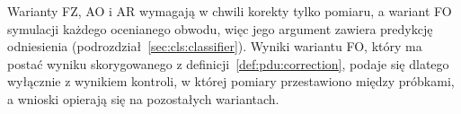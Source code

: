 
Warianty FZ, AO i AR wymagają w chwili korekty tylko pomiaru, a wariant FO symulacji każdego ocenianego obwodu, więc jego argument zawiera predykcję odniesienia (podrozdział~\ref{sec:cls:classifier}).
Wyniki wariantu FO, który ma postać wyniku skorygowanego z definicji~\ref{def:pdu:correction}, podaje się dlatego wyłącznie z wynikiem kontroli, w której pomiary przestawiono między próbkami, a wnioski opierają się na pozostałych wariantach.


